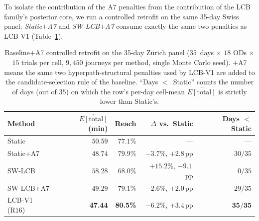 \documentclass[11pt]{article}
\theoremstyle{definition}
\theoremstyle{remark}
\begin{document}
To isolate the contribution of the A7 penalties from the
contribution of the LCB family's posterior core, we run a
controlled retrofit on the same 35-day Swiss panel: \emph{Static$+$A7}
and \emph{SW-LCB$+$A7} consume exactly the same two penalties as
LCB-V1 (Table~\ref{tab:baseline_a7_audit}).

\begin{table}[h]
\centering
\caption{Baseline$+$A7 controlled retrofit on the 35-day Z\"urich
panel ($35$~days $\times$ $18$ ODs $\times$ $15$ trials per
cell, $9{,}450$ journeys per method, single Monte Carlo seed).
$+$A7 means the same two hyperpath-structural penalties used by
LCB-V1 are added to the candidate-selection rule of the baseline.
``Days $<$~Static'' counts the number of days (out of $35$) on
which the row's per-day cell-mean $\overline{E[\mathrm{total}]}$
is strictly lower than Static's.}
\label{tab:baseline_a7_audit}
\scriptsize
\begin{tabular}{lrrrr}
\toprule
Method & $\overline{E[\mathrm{total}]}$ (min) & Reach & $\Delta$ vs.\ Static & Days $<$~Static \\
\midrule
Static          & $50.59$ & $77.1\%$ & --- & --- \\
Static$+$A7     & $48.74$ & $79.9\%$ & $-3.7\%$, $+2.8$\,pp & $30/35$ \\
SW-LCB          & $58.28$ & $68.0\%$ & $+15.2\%$, $-9.1$\,pp & $0/35$ \\
SW-LCB$+$A7     & $49.29$ & $79.1\%$ & $-2.6\%$, $+2.0$\,pp & $29/35$ \\
LCB-V1 (R16)    & \textbf{47.44} & \textbf{80.5\%} & $-6.2\%$, $+3.4$\,pp & $\mathbf{35/35}$ \\
\bottomrule
\end{tabular}
\end{table}
\end{document}
